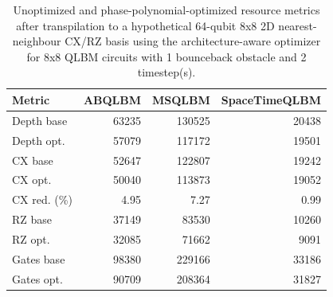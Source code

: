 \begin{table}[ht]
\centering
\begin{tabular}{lrrr}
\hline
Metric & ABQLBM & MSQLBM & SpaceTimeQLBM \\
\hline
Depth base & 63235 & 130525 & 20438 \\
Depth opt. & 57079 & 117172 & 19501 \\
CX base & 52647 & 122807 & 19242 \\
CX opt. & 50040 & 113873 & 19052 \\
CX red. (\%) & 4.95 & 7.27 & 0.99 \\
RZ base & 37149 & 83530 & 10260 \\
RZ opt. & 32085 & 71662 & 9091 \\
Gates base & 98380 & 229166 & 33186 \\
Gates opt. & 90709 & 208364 & 31827 \\
\hline
\end{tabular}
\caption{Unoptimized and phase-polynomial-optimized resource metrics after transpilation to a hypothetical 64-qubit 8x8 2D nearest-neighbour CX/RZ basis using the architecture-aware optimizer for 8x8 QLBM circuits with 1 bounceback obstacle and 2 timestep(s).}
\label{tab:phase-poly-optimization-comparison-8x8-obs1-t2-2d-grid}
\end{table}
